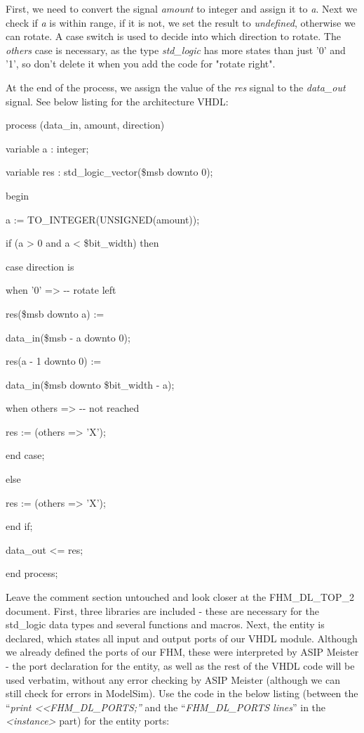\documentclass[
]{article}
\begin{document}
First, we need to convert the signal \emph{amount} to integer and assign
it to \emph{a}. Next we check if \emph{a} is within range, if it is not,
we set the result to \emph{undefined}, otherwise we can rotate. A case
switch is used to decide into which direction to rotate. The
\emph{others} case is necessary, as the type \emph{std\_logic} has more
states than just '0' and '1', so don't delete it when you add the code
for "rotate right".

At the end of the process, we assign the value of the \emph{res} signal
to the \emph{data\_out} signal. See below listing for the architecture
VHDL:

process (data\_in, amount, direction)

variable a : integer;

variable res : std\_logic\_vector(\$msb downto 0);

begin

a := TO\_INTEGER(UNSIGNED(amount));

if (a \textgreater{} 0 and a \textless{} \$bit\_width) then

case direction is

when '0' =\textgreater{} -\/- rotate left

res(\$msb downto a) :=

data\_in(\$msb - a downto 0);

res(a - 1 downto 0) :=

data\_in(\$msb downto \$bit\_width - a);

when others =\textgreater{} -\/- not reached

res := (others =\textgreater{} 'X');

end case;

else

res := (others =\textgreater{} 'X');

end if;

data\_out \textless= res;

end process;

Leave the comment section untouched and look closer at the
FHM\_DL\_TOP\_2 document. First, three libraries are included - these
are necessary for the std\_logic data types and several functions and
macros. Next, the entity is declared, which states all input and output
ports of our VHDL module. Although we already defined the ports of our
FHM, these were interpreted by ASIP Meister - the port declaration for
the entity, as well as the rest of the VHDL code will be used verbatim,
without any error checking by ASIP Meister (although we can still check
for errors in ModelSim). Use the code in the below listing (between the
``\emph{print \textless\textless FHM\_DL\_PORTS;''} and the
``\emph{FHM\_DL\_PORTS lines}'' in the
\emph{\textless instance\textgreater{}} part) for the entity ports:
\end{document}
